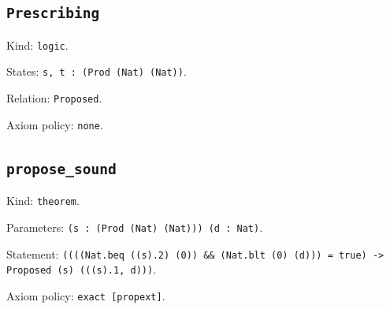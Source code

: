 \documentclass[11pt]{article}
\begin{document}
\subsection*{\texttt{Prescribing}}
\noindent Kind: \texttt{logic}.\par
\noindent States: \texttt{s, t : (Prod (Nat) (Nat))}.\par
\noindent Relation: \texttt{Proposed}.\par
\noindent Axiom policy: \texttt{none}.\par
\subsection*{\texttt{propose\_sound}}
\noindent Kind: \texttt{theorem}.\par
\noindent Parameters: \texttt{(s : (Prod (Nat) (Nat))) (d : Nat)}.\par
\noindent Statement: \texttt{((((Nat.beq ((s).2) (0)) \&\& (Nat.blt (0) (d))) = true) -> Proposed (s) (((s).1, d)))}.\par
\noindent Axiom policy: \texttt{exact [propext]}.\par
\end{document}
